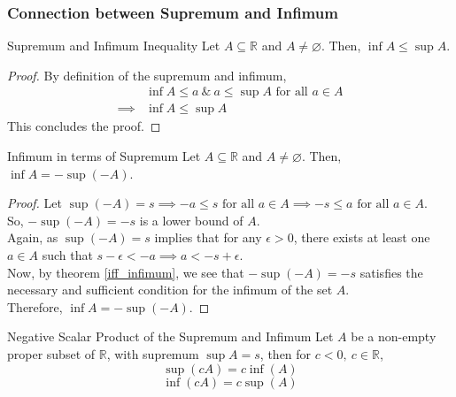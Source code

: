\subsubsection{Connection between Supremum and Infimum}
\begin{Theorem}{Supremum and Infimum Inequality}\label{sup_inf_inequality}
    Let $A\subseteq\mathbb{R}$ and $A\neq\varnothing$. Then, $\inf A\leq\sup A$.
\end{Theorem}
\begin{proof}
    By definition of the supremum and infimum,
    \begin{align*}
        & \inf A\leq a\ \&\ a\leq \sup A\text{ for all }a\in A\\
        \implies& \inf A\leq \sup A
    \end{align*}
    This concludes the proof.
\end{proof}
\begin{Theorem}{Infimum in terms of Supremum}\label{infimum_in_terms_of_supremum}
    Let $A\subseteq\mathbb{R}$ and $A\neq\varnothing$. Then, $\inf A=-\sup(-A)$.
\end{Theorem}
\begin{proof}
    Let $\sup(-A)=s\implies-a\leq s\text{ for all }a\in A\implies-s\leq a\text{ for all }a\in A$.\\
    So, $-\sup(-A)=-s$ is a lower bound of $A$.\\
    Again, as $\sup(-A)=s$ implies that for any $\epsilon>0$, there exists at least one $a\in A$ such that $s-\epsilon< -a\implies a<-s+\epsilon$.\\
    Now, by theorem \eqref{iff_infimum}, we see that $-\sup(-A)=-s$ satisfies the necessary and sufficient condition for the infimum of the set $A$.\\
    Therefore, $\inf A=-\sup(-A)$.
\end{proof}
\begin{Theorem}{Negative Scalar Product of the Supremum and Infimum}\label{negative_scalar_product_supremum_infimum}
    Let $A$ be a non-empty proper subset of $\mathbb{R}$, with supremum $\sup A=s$, then for $c<0,\ c\in\mathbb{R}$, $$\sup(cA)=c\inf(A)$$ $$\inf(cA)=c\sup(A)$$
\end{Theorem}
